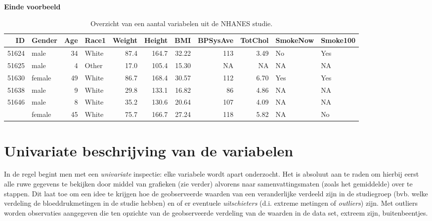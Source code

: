 \documentclass[
  12pt,dutch]{book}
\theoremstyle{definition}
\theoremstyle{definition}
\theoremstyle{definition}
\theoremstyle{definition}
\theoremstyle{remark}
\begin{document}
\textbf{Einde voorbeeld}

\begin{table}

\caption{\label{tab:nhanesDatExpl}Overzicht van een aantal variabelen uit de NHANES studie.}
\centering
\begin{tabular}[t]{rlrlrrrrrll}
\toprule
ID & Gender & Age & Race1 & Weight & Height & BMI & BPSysAve & TotChol & SmokeNow & Smoke100\\
\midrule
51624 & male & 34 & White & 87.4 & 164.7 & 32.22 & 113 & 3.49 & No & Yes\\
51625 & male & 4 & Other & 17.0 & 105.4 & 15.30 & NA & NA & NA & NA\\
51630 & female & 49 & White & 86.7 & 168.4 & 30.57 & 112 & 6.70 & Yes & Yes\\
51638 & male & 9 & White & 29.8 & 133.1 & 16.82 & 86 & 4.86 & NA & NA\\
51646 & male & 8 & White & 35.2 & 130.6 & 20.64 & 107 & 4.09 & NA & NA\\
\addlinespace
51647 & female & 45 & White & 75.7 & 166.7 & 27.24 & 118 & 5.82 & NA & No\\
\bottomrule
\end{tabular}
\end{table}

\section{Univariate beschrijving van de variabelen}\label{sec:univar}

In de regel begint men met een \emph{univariate} inspectie: elke variabele
wordt apart onderzocht. Het is absoluut aan te raden om hierbij eerst alle
ruwe gegevens te bekijken door middel van grafieken (zie verder) alvorens
naar samenvattingsmaten (zoals het gemiddelde) over te stappen. Dit laat toe
om een idee te krijgen hoe de geobserveerde waarden van een veranderlijke
verdeeld zijn in de studiegroep (bvb. welke verdeling de bloeddrukmetingen in de studie hebben)
en of er eventuele \emph{uitschieters} (d.i. extreme
metingen of \emph{outliers}) zijn. Met outliers worden observaties
aangegeven die ten opzichte van de geobserveerde verdeling van de waarden in
de data set, extreem zijn, buitenbeentjes.
\end{document}
